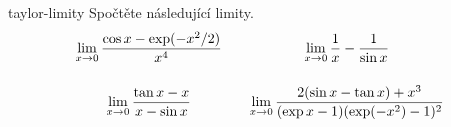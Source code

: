 \begin{exercise}{}{taylor-limity}
 Spočtěte následující limity.
 \[
  {\everymath={\displaystyle}
   \arraycolsep=1em
   \begin{array}{cc}
    \lim_{x \to 0} \frac{\cos x - \exp(-x^2 / 2)}{x^{4}} & \lim_{x \to 0}
    \frac{1}{x} - \frac{1}{\sin x}\\[2em]
    \lim_{x \to 0} \frac{\tan x - x}{x - \sin x} & \lim_{x \to 0} \frac{2(\sin x
    - \tan x) + x^3}{(\exp x - 1)(\exp(-x^2)-1)^2}
   \end{array}
  }
 \]
 
\end{exercise}
